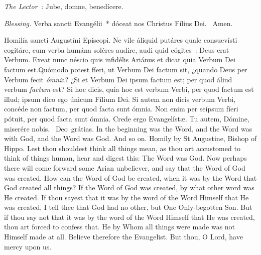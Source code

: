 {{  }

  {
    \bigskip
    {
    }
    \medskip

    \emph{The Lector~:} Jube, domne, benedícere.

    \emph{Blessing.} Verba sancti Evangélii~* dóceat nos Christus Fílius Dei. \Rbar{}~Amen.
  }

  \bigskip{}
  {


  }

  {

    \begin{parcolumns}[rulebetween,colwidths={1=.45\linewidth}]{2}
    {Homilía sancti Augustíni Epíscopi.}%
    {Ne vile áliquid putáres quale consuevísti cogitáre, cum verba humána soléres audíre, audi quid cógites~: Deus erat Verbum. Exeat nunc néscio quis infidélis Ariánus et dicat quia Verbum Dei factum est.}{Quómodo potest fíeri, ut Verbum Dei factum sit, ¿quando Deus per Verbum fecit \emph{ómni}a? ¿Si et Verbum Dei ipsum factum est; per quod áliud verbum \emph{factum} est? Si hoc dicis, quia hoc est verbum Verbi, per quod factum est illud; ipsum dico ego únicum Fílium Dei. Si autem non dicis verbum Verbi, concéde non factum, per quod facta sunt ómnia. Non enim per seípsum fíeri pótuit, per quod facta sunt ómnia. Crede ergo Evangelístæ.
      Tu autem, Dómine, miserére nobis.
      \Rbar{}~Deo~grátias.}%
    {In the beginning was the Word, and the Word was with God, and the Word was God. And so on.}%
    {Homily by St Augustine, Bishop of Hippo.}%
    {Lest thou shouldest think all things mean, as thou art accustomed to think of things human, hear and digest this: The Word was God. Now perhaps there will come forward some Arian unbeliever, and say that the Word of God was created. How can the Word of God be created, when it was by the Word that God created all things? If the Word of God was created, by what other word was He created. If thou sayest that it was by the word of the Word Himself that He was created, I tell thee that God had no other, but One Only-begotten Son. But if thou say not that it was by the word of the Word Himself that He was created, thou art forced to confess that. He by Whom all things were made was not Himself made at all. Believe therefore the Evangelist.
      But thou, O Lord, have mercy upon us.}
    \end{parcolumns}

}}
